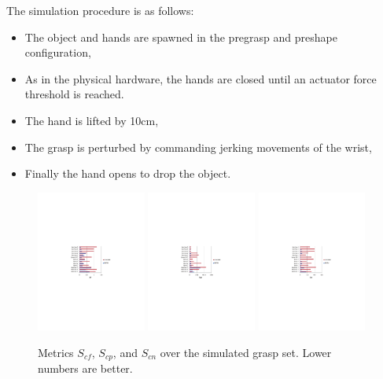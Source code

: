 The simulation procedure is as follows:
\begin{itemize}
\item The object and hands are spawned in the pregrasp and preshape configuration,
\item As in the physical hardware, the hands are closed until an actuator force threshold is reached.
\item The hand is lifted by 10cm,
\item The grasp is perturbed by commanding jerking movements of the wrist,
\item Finally the hand opens to drop the object.
\end{itemize}

\begin{figure}
\centering
\includegraphics[width=0.32\textwidth]{images/ssoch/scf_metrics.pdf}
\includegraphics[width=0.32\textwidth]{images/ssoch/scp_metrics.pdf}
\includegraphics[width=0.32\textwidth]{images/ssoch/scn_metrics.pdf}
\caption{Metrics $S_{cf}$, $S_{cp}$, and $S_{cn}$ over the simulated grasp set. Lower numbers are better.}
\label{fig:AllMetrics}
\end{figure}

